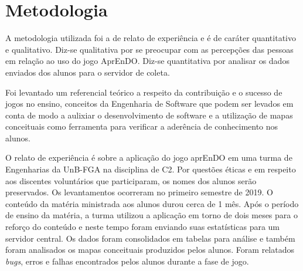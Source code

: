\chapter[Metodologia]{Metodologia}
A metodologia utilizada foi a de relato de experiência e é de caráter quantitativo e qualitativo. Diz-se qualitativa por se preocupar com as percepções das pessoas em relação ao uso do jogo AprEnDO. Diz-se quantitativa por analisar os dados enviados dos alunos para o servidor de coleta. 

Foi levantado um referencial teórico a respeito da contribuição e o sucesso de jogos no ensino, conceitos da Engenharia de Software que podem ser levados em conta de modo a aulixiar o desenvolvimento de software e a utilização de mapas conceituais como ferramenta para verificar a aderência de conhecimento nos alunos.

O relato de experiência é sobre a aplicação do jogo aprEnDO em uma turma de Engenharias da UnB-FGA na disciplina de C2. Por questões éticas e em respeito aos discentes voluntários que participaram, os nomes dos alunos serão preservados. Os levantamentos ocorreram no primeiro semestre de 2019. O conteúdo da matéria ministrada aos alunos durou cerca de 1 mês. Após o período de ensino da matéria, a turma utilizou a aplicação em torno de dois meses para o reforço do conteúdo e neste tempo foram enviando suas estatísticas para um servidor central. Os dados foram consolidados em tabelas para análise e também foram analisados os mapas conceituais produzidos pelos alunos. Foram relatados \textit{bugs}, erros e falhas encontrados pelos alunos durante a fase de jogo. 